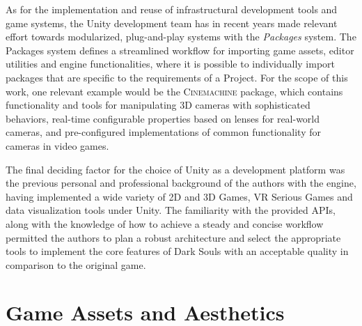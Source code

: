 As for the implementation and reuse of infrastructural development tools and game systems, the Unity development team has in recent years made relevant effort towards modularized, plug-and-play systems with the \emph{Packages} system. The Packages system defines a streamlined workflow for importing game assets, editor utilities and engine functionalities, where it is possible to individually import packages that are specific to the requirements of a Project. For the scope of this work, one relevant example would be the \textsc{Cinemachine} package, which contains functionality and tools for manipulating 3D cameras with sophisticated behaviors, real-time configurable properties based on lenses for real-world cameras, and pre-configured implementations of common functionality for cameras in video games.

The final deciding factor for the choice of Unity as a development platform was the previous personal and professional background of the authors with the engine, having implemented a wide variety of 2D and 3D Games, VR Serious Games and data visualization tools under Unity. The familiarity with the provided APIs, along with the knowledge of how to achieve a steady and concise workflow permitted the authors to plan a robust architecture and select the appropriate tools to implement the core features of Dark Souls with an acceptable quality in comparison to the original game.


\section{Game Assets and Aesthetics}

